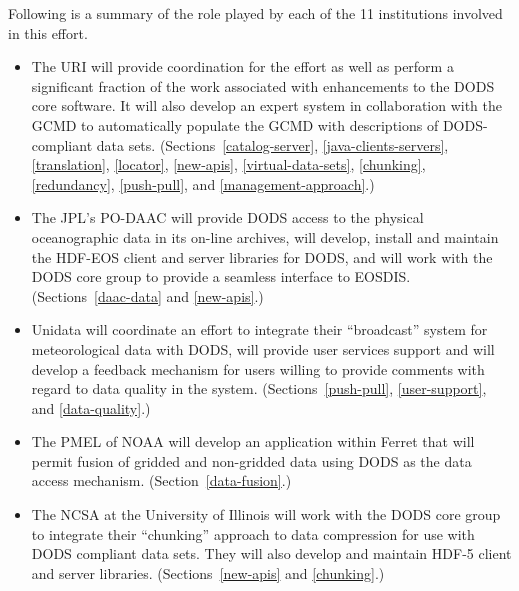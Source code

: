 \documentclass[12pt]{article}
\begin{document}
\vfill\eject
\vfill\eject

\bigskip

Following is a summary of the role played by each of the 11 institutions
involved in this effort.

\baselineskip 11pt
\begin{itemize}
\item The \acl{URI} will provide coordination for the effort as 
well as perform a significant fraction of the work associated with 
enhancements to the \ac{DODS} core software. It will also develop an 
expert system in collaboration with the \ac{GCMD} to automatically 
populate the \ac{GCMD} with descriptions of \ac{DODS}-compliant data 
sets. (Sections~\ref{catalog-server}, \ref{java-clients-servers}, 
\ref{translation}, \ref{locator}, \ref{new-apis}, 
\ref{virtual-data-sets},  \ref{chunking}, \ref{redundancy}, 
\ref{push-pull}, and \ref{management-approach}.)

\item The \ac{JPL}'s \ac{PO-DAAC} will provide \ac{DODS} access to the 
physical oceanographic data in its on-line archives, will develop, 
install and maintain the \acs{HDF-EOS} client and server libraries for 
\ac{DODS}, and will work with the \ac{DODS} core group to provide
a seamless interface to \acs{EOSDIS}. (Sections~\ref{daac-data} and 
\ref{new-apis}.)

\item Unidata will coordinate an effort to integrate 
their ``broadcast'' system for meteorological data with \ac{DODS}, 
will provide user services support and will develop a feedback 
mechanism for users willing to provide comments with regard to data 
quality in the system. (Sections~\ref{push-pull}, \ref{user-support}, 
and \ref{data-quality}.)

\item The \acl{PMEL} of \ac{NOAA} will develop an application within 
Ferret that will permit fusion of gridded and non-gridded data using 
\ac{DODS} as the data access mechanism. (Section~\ref{data-fusion}.)

\item The \acl{NCSA} at the University of Illinois will work with the 
\ac{DODS} core group to integrate their ``chunking'' approach to data 
compression for use with \ac{DODS} compliant data sets. They will also 
develop and maintain \acs{HDF}-5 client and server libraries. 
(Sections~\ref{new-apis} and \ref{chunking}.)


\end{itemize}
\end{document}

